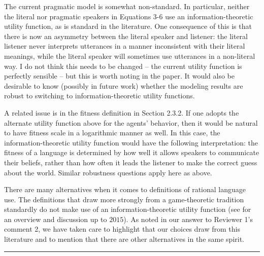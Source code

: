 \documentclass[12pt,a4paper]{article}
\begin{document}
\begin{mdframed}[backgroundcolor=gray!25,linecolor=gray!25,frametitle= Reviewer \thereviewerCounter~comment \thereviewerCommentCounter \hfill ~~({\it definitions in rational language use})]
%
The current pragmatic model is somewhat non-standard. In particular, neither the literal nor pragmatic speakers in Equations 3-6 use an information-theoretic utility function, as is standard in the literature. One consequence of this is that there is now an asymmetry between the literal speaker and listener: the literal listener never interprets utterances in a manner inconsistent with their literal meanings, while the literal speaker will sometimes use utterances in a non-literal way. I do not think this needs to be changed -- the current utility function is perfectly sensible -- but this is worth noting in the paper. It would also be desirable to know (possibly in future work) whether the modeling results are robust to switching to information-theoretic utility functions.

%
\end{mdframed}
\begin{mdframed}[backgroundcolor=gray!25,linecolor=gray!25]
%
A related issue is in the fitness definition in Section 2.3.2. If one adopts the alternate utility function above for the agents' behavior, then it would be natural to have fitness scale in a logarithmic manner as well. In this case, the information-theoretic utility function would have the following interpretation: the fitness of a language is determined by how well it allows speakers to communicate their beliefs, rather than how often it leads the listener to make the correct guess about the world. Similar robustness questions apply here as above.

%
\end{mdframed}
There are many alternatives when it comes to definitions of rational language use. The definitions that draw more strongly from a game-theoretic tradition standardly do not make use of an information-theoretic utility function (see \citealt{qing+franke:2015} for an overview and discussion up to $2015$). As noted in our answer to Reviewer 1's comment 2, we have taken care to highlight that our choices draw from this literature and to mention that there are other alternatives in the same spirit. 

%

\vspace{0.5cm}

\noindent\rule{\textwidth}{1pt}
\end{document}
